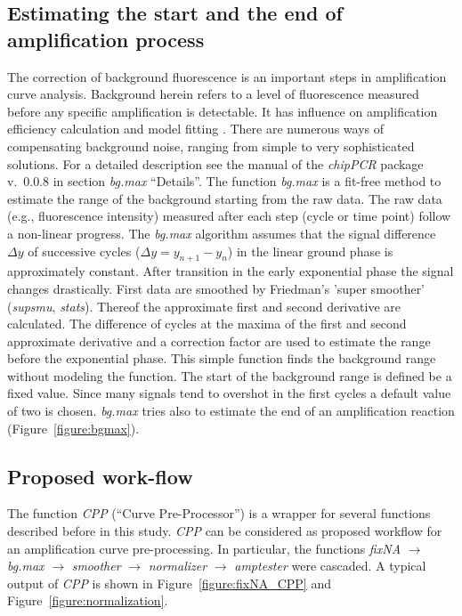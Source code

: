 \documentclass[twocolumn]{bmcart}%
\begin{document}
\subsection*{Estimating the start and the end of amplification process}

  The correction of background fluorescence is an important steps in 
amplification curve analysis. Background herein refers to a level of 
fluorescence measured before any specific amplification is detectable. It has 
influence on amplification efficiency calculation and model fitting 
\cite{tuomi_2010, rutledge_2008, ruijter_2009}. There are numerous ways of 
compensating background noise, ranging from simple to very sophisticated 
solutions. For a detailed description see the manual of the \textsl{chipPCR} 
package v.~0.0.8 in section \textsl{bg.max} ``Details''. The function 
\textsl{bg.max} is a fit-free method to estimate the range of the background 
starting from the raw data. The raw data (e.g., fluorescence intensity) 
measured 
after each step (cycle or time point) follow a non-linear progress. The 
\textsl{bg.max} algorithm assumes that the signal difference $\Delta{y}$ of 
successive cycles ($\Delta{y} = y_{n + 1} - y_n$) in the linear ground phase is 
approximately constant. After transition in the early exponential phase the 
signal changes drastically. First data are smoothed by Friedman’s ’super 
smoother’ (\textsl{supsmu}, \emph{stats}). Thereof the approximate first and 
second derivative are calculated. The difference of cycles at the maxima of the 
first and second approximate derivative and a correction factor are used to 
estimate the range before the exponential phase. This simple function finds the 
background range without modeling the function. The start of the background 
range is defined be a fixed value. Since many signals tend to overshot in the 
first cycles a default value of two is chosen. \textsl{bg.max} tries also to 
estimate the end of an amplification reaction (Figure~\ref{figure:bgmax}).

\subsection*{Proposed work-flow}

The function \textsl{CPP} (``Curve Pre-Processor'') is a wrapper for several 
functions described before in this study. \textsl{CPP} 
can be considered as proposed workflow for an amplification curve 
pre-processing. In particular, the functions \textsl{fixNA} $\rightarrow$ 
\textsl{bg.max} $\rightarrow$ \textsl{smoother} $\rightarrow$ 
\textsl{normalizer} $\rightarrow$ \textsl{amptester} were cascaded. A typical 
output of \textsl{CPP} is shown in Figure~\ref{figure:fixNA_CPP} and 
Figure~\ref{figure:normalization}.
\end{document}
